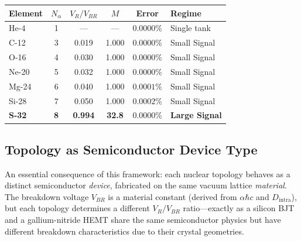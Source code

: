 \begin{table}[htbp]
\begin{tabularx}{\textwidth}{@{}l c c c c X@{}}
\textbf{Element} & $N_\alpha$ & $V_R / V_{BR}$ & $M$ & \textbf{Error} & \textbf{Regime} \\
\hline
He-4  & 1 & --- & --- & $0.0000\%$ & Single tank \\
C-12  & 3 & 0.019 & 1.000 & $0.0000\%$ & Small Signal \\
O-16  & 4 & 0.030 & 1.000 & $0.0000\%$ & Small Signal \\
Ne-20 & 5 & 0.032 & 1.000 & $0.0000\%$ & Small Signal \\
Mg-24 & 6 & 0.040 & 1.000 & $0.0001\%$ & Small Signal \\
Si-28 & 7 & 0.050 & 1.000 & $0.0002\%$ & Small Signal \\
\textbf{S-32}  & \textbf{8} & \textbf{0.994} & \textbf{32.8} & $\mathbf{0.0000\%}$ & \textbf{Large Signal} \\
\hline
\end{tabularx}
\end{table}

\subsection{Topology as Semiconductor Device Type}

An essential consequence of this framework: each nuclear topology behaves as a distinct semiconductor \textit{device}, fabricated on the same vacuum lattice \textit{material}. The breakdown voltage $V_{BR}$ is a material constant (derived from $\alpha\hbar c$ and $D_\text{intra}$), but each topology determines a different $V_R / V_{BR}$ ratio---exactly as a silicon BJT and a gallium-nitride HEMT share the same semiconductor physics but have different breakdown characteristics due to their crystal geometries.

